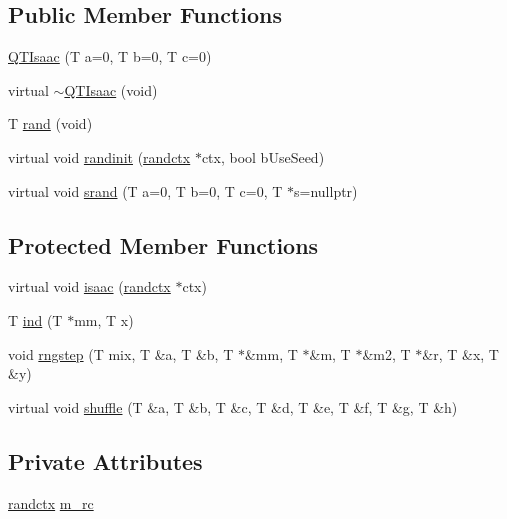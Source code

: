 \subsection*{Public Member Functions}
\begin{DoxyCompactItemize}
\item 
\hyperlink{classQTIsaac_afbf292ab78e041bd2bbd5066241d88c3}{Q\+T\+Isaac} (T a=0, T b=0, T c=0)
\item 
virtual \hyperlink{classQTIsaac_ab0dfe7af413f019311ec43aec83a0592}{$\sim$\+Q\+T\+Isaac} (void)
\item 
T \hyperlink{classQTIsaac_a43a34ab9819572127d4f13e7344b2a95}{rand} (void)
\item 
virtual void \hyperlink{classQTIsaac_a5d1004b08f22ef74794597d139ca31b7}{randinit} (\hyperlink{structQTIsaac_1_1randctx}{randctx} $\ast$ctx, bool b\+Use\+Seed)
\item 
virtual void \hyperlink{classQTIsaac_ae8ec04439ce5f24bb3b337065f9148a9}{srand} (T a=0, T b=0, T c=0, T $\ast$s=nullptr)
\end{DoxyCompactItemize}
\subsection*{Protected Member Functions}
\begin{DoxyCompactItemize}
\item 
virtual void \hyperlink{classQTIsaac_aa92e5e94f65d61e9395664dc5d2cf9b3}{isaac} (\hyperlink{structQTIsaac_1_1randctx}{randctx} $\ast$ctx)
\item 
T \hyperlink{classQTIsaac_a4b1bca72fa71e1ee79c285047e55a469}{ind} (T $\ast$mm, T x)
\item 
void \hyperlink{classQTIsaac_a97aee0e8269aa92acc9237dff6a8a370}{rngstep} (T mix, T \&a, T \&b, T $\ast$\&mm, T $\ast$\&m, T $\ast$\&m2, T $\ast$\&r, T \&x, T \&y)
\item 
virtual void \hyperlink{classQTIsaac_a9eb2ef09b2864b5b2b0406b7d0236ade}{shuffle} (T \&a, T \&b, T \&c, T \&d, T \&e, T \&f, T \&g, T \&h)
\end{DoxyCompactItemize}
\subsection*{Private Attributes}
\begin{DoxyCompactItemize}
\item 
\hyperlink{structQTIsaac_1_1randctx}{randctx} \hyperlink{classQTIsaac_a7eb189761ac0cd7dea189572e544cb9a}{m\+\_\+rc}
\end{DoxyCompactItemize}


